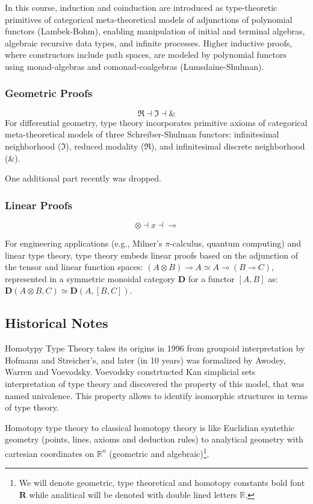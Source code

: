 \documentclass{article}
\theoremstyle{definition}
\begin{document}
In this course, induction and coinduction are introduced as type-theoretic
primitives of categorical meta-theoretical models of adjunctions of
polynomial functors (Lambek-Bohm), enabling manipulation of initial
and terminal algebras, algebraic recursive data types, and infinite
processes. Higher inductive proofs, where constructors include path
spaces, are modeled by polynomial functors using monad-algebras and
comonad-coalgebras (Lumsdaine-Shulman).

\subsubsection{Geometric Proofs}
$$
\Re \dashv \Im \dashv \&
$$
For differential geometry, type theory incorporates primitive axioms of
categorical meta-theoretical models of three Schreiber-Shulman functors:
infinitesimal neighborhood (\(\Im\)), reduced modality (\(\Re\)), and
infinitesimal discrete neighborhood (\(\&\)).

\newpage
One additional part recently was dropped.

\subsubsection{Linear Proofs}

$$
\otimes \dashv x \dashv \multimap
$$

For engineering applications (e.g., Milner's $\pi$-calculus, quantum computing)
and linear type theory, type theory embeds linear proofs based on the adjunction
of the tensor and linear function spaces: $(A \otimes B) \multimap A \simeq A \multimap (B \multimap C)$,
represented in a symmetric monoidal category $\mathbf{D}$ for a functor $[A,B]$ as:
$\mathbf{D}(A \otimes B, C) \simeq \mathbf{D}(A, [B,C])$.

\subsection{Historical Notes}
Homotypy Type Theory takes its origins in 1996 from groupoid interpretation by
Hofmann and Streicher's, and later (in 10 years) was formalized by Awodey,
Warren and Voevodsky. Voevodsky constrtucted Kan simplicial sets interpretation
of type theory and discovered the property of this model, that was named univalence.
This property allows to identify isomorphic structures in terms of type theory.

Homotopy type theory to classical homotopy theory is like Euclidian
syntethic geometry (points, lines, axioms and deduction rules) to
analytical geometry with cartesian coordinates on $\mathbb{R}^n$ (geometric and algebraic)\footnote{We will denote geometric, type theoretical and homotopy constants
bold font $\mathbf{R}$ while analitical will be denoted with double lined letters $\mathbb{R}$.}.
\end{document}
